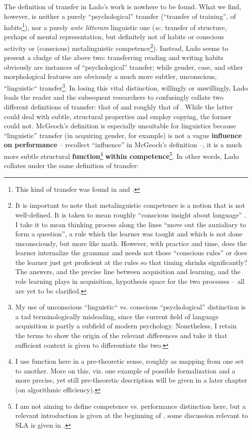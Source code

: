 \documentclass{article}
\begin{document}
The definition of transfer in Lado’s work is nowhere to be found. What we find, however, is neither a purely ``psychological'' transfer (``transfer of training'', of habits\footnote{This kind of transfer was found in \cite{rugg_experimental_1916} and \cite{mcgeoch_psychology_1942}.}), nor a purely \textit{ante litteram} linguistic one  (\textit{sc.} transfer of structure, perhaps of mental representation, but definitely not of habits or conscious activity or (conscious) metalinguistic competence\footnote{It is important to note that metalinguistic competence is a notion that is not well-defined. It is taken to mean roughly ``conscious insight about language'' \citep[take, e.g.,][]{bardel_role_2007, bardel_l2_2017}. I take it to mean thinking process along the lines ``move out the auxialiary to form a question'', a rule which the learner was taught and which is not done unconsciously, but more like math. However, with practice and time, does the learner internalize the grammar and needs not those ``conscious rules'' or does the learner just get proficient at the rules so that timing shrinks significantly? The answers, and the precise line between acquisition and learning, and the role learning plays in acquisition, hypothesis space for the two processes -- all are  yet to be clarified.}). Instead, Lado seems to present a cludge of the above two: transferring reading and writing habits obviously are instances of ``psychological'' transfer; while gender, case, and other morphological features are obviously a much more subtler, unconscious, ``linguistic`` transfer\footnote{My use of unconscious ``linguistic`` vs. conscious ``psychological'' distinction is a tad terminologically misleading, since the current field of language acquisition is partly a subfield of modern psychology. Nonetheless, I retain the terms to show the origin of the relevant differences and take it that sufficient context is given to differentiate the two.}. In losing this vital distinction, willingly or unwillingly, Lado leads the reader and the subsequent researchers to confusingly collate two different definitions of transfer: that of \cite{mcgeoch_psychology_1942} and roughly that of \citeyear{james_principles_1890-1}. While the latter could deal with subtle, structural properties and employ copying, the former could not. McGeoch’s definition is especially unsuitable for linguistics because ``linguistic'' transfer (in acquiring gender, for example) is not a vague \textbf{influence on performance} -- recollect ``influence'' in McGeoch's definition --, it is a much more subtle structural \textbf{function}\footnote{I use function here in a pre-theoretic sense, roughly as mapping from one set to another. More on this, viz. one example of possible formalization and a more precise, yet still pre-theoretic description will be given in a later chapter (on algorithmic efficiency).} \textbf{within competence}\footnote{I am not aiming to define competence vs. performance distinction here, but a relevant introduction is given at the beginning of \cite{chomsky_aspects_1965}, some discussion relevant to SLA is given in \cite{epstein_universal_1996}.}. In other words, Lado collates under the same definition of transfer: 
\end{document}
